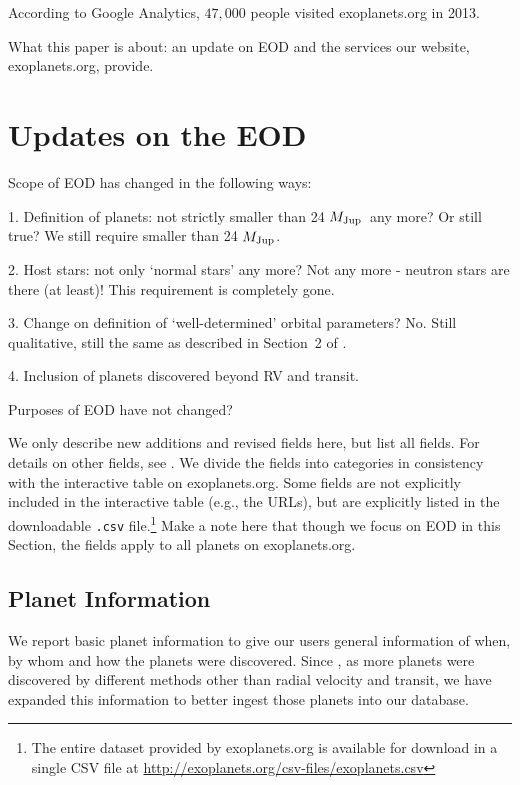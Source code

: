 \documentclass[11pt,preprint]{aastex}
\def\mjup{$M_{\rm Jup}$}
\begin{document}
\begin{CJK*}{UTF8}{gbsn}


According to Google Analytics, $47,000$ people visited exoplanets.org
in 2013.

What this paper is about: an update on EOD and the services our
website, exoplanets.org, provide.




\section{Updates on the EOD}\label{sec:update}

Scope of EOD has changed in the following ways:

1. Definition of planets: not strictly smaller than 24 \mjup\ any
more? Or still true? We still require smaller than 24 \mjup.

2. Host stars: not only `normal stars' any more? Not any more -
neutron stars are there (at least)! This requirement is completely gone.

3. Change on definition of `well-determined' orbital parameters? No. Still
qualitative, still the same as described in Section~2 of \cite{Wright2011}.

4. Inclusion of planets discovered beyond RV and transit.

Purposes of EOD have not changed?

We only describe new additions and revised fields here, but list all
fields. For details on other fields, see \cite{Wright2011}. We divide
the fields into categories in consistency with the interactive table
on exoplanets.org. Some fields are not explicitly included in the
interactive table (e.g., the URLs), but are explicitly listed in the
downloadable {\tt .csv} file.\footnote{The entire dataset provided by
  exoplanets.org is available for download in a single CSV file at
  \url{http://exoplanets.org/csv-files/exoplanets.csv}} Make a note
here that though we focus on EOD in this Section, the fields apply to
all planets on exoplanets.org.

\subsection{Planet Information}

We report basic planet information to give our users general
information of when, by whom and how the planets were
discovered. Since \cite{Wright2011}, as more planets were discovered
by different methods other than radial velocity and transit, we have
expanded this information to better ingest those planets into our
database.


\end{CJK*}
\end{document}

